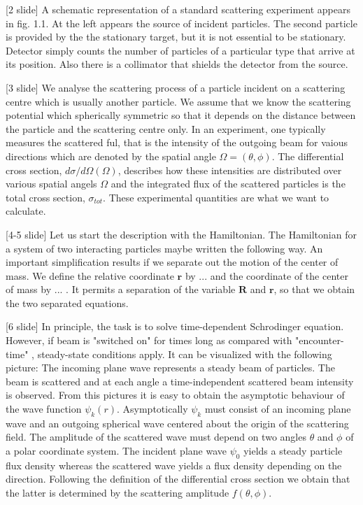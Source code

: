 \documentclass[12pt]{article}
\begin{document}
[2 slide] A schematic representation of a standard scattering experiment appears in fig. 1.1. At the left appears the source of incident particles. The second particle is provided by the the stationary target, but it is not essential to be stationary. Detector simply counts the number of particles of a particular type that arrive at its position. Also there is a collimator that shields the detector from the source.

[3 slide] We analyse the scattering process of a particle incident on a scattering centre which is usually another particle. We assume that we know the scattering potential which spherically symmetric so that it depends on the distance between the particle and the scattering centre only. 
In an experiment, one typically measures the scattered ful, that is the intensity of the outgoing beam for vaious directions which are denoted by the spatial angle $\Omega = (\theta, \phi)$. The differential cross section, $d\sigma / d\Omega (\Omega)$, describes how these intensities are distributed over various spatial angels $\Omega$ and the integrated flux of the scattered particles is the total cross section, $\sigma_{tot}$. These experimental quantities are what we want to calculate.
 

[4-5 slide] Let us start the description with the Hamiltonian. The Hamiltonian for a system of two interacting particles maybe written the following way. An important simplification results if we separate out the motion of the center of mass. We define the relative coordinate $\mathbf{r}$ by ... and the coordinate of the center of mass by ... . It permits a separation of the variable $\mathbf{R}$ and $\mathbf{r}$, so that we obtain the two separated equations.    

[6 slide] In principle, the task is to solve time-dependent Schrodinger equation. However, if beam is "switched on" for times long as compared with "encounter-time" , steady-state conditions apply. It can be visualized with the following picture: The incoming plane wave represents a steady beam of particles. The beam is scattered and at each angle a time-independent scattered beam intensity is observed.
From this pictures it is easy to obtain the asymptotic behaviour of the wave function $\psi_k(r)$. Asymptotically $\psi_k$ must consist of an incoming plane wave and an outgoing spherical wave centered about the origin of the scattering field.  The amplitude of the scattered wave must depend on two angles $\theta$ and $\phi$ of a polar coordinate system.  The incident plane wave $\psi_0$ yields a steady particle flux density whereas the scattered wave yields a flux density depending on the direction.
Following the definition of the differential cross section we obtain that the latter is determined by the scattering amplitude $f(\theta, \phi)$.
\end{document}
